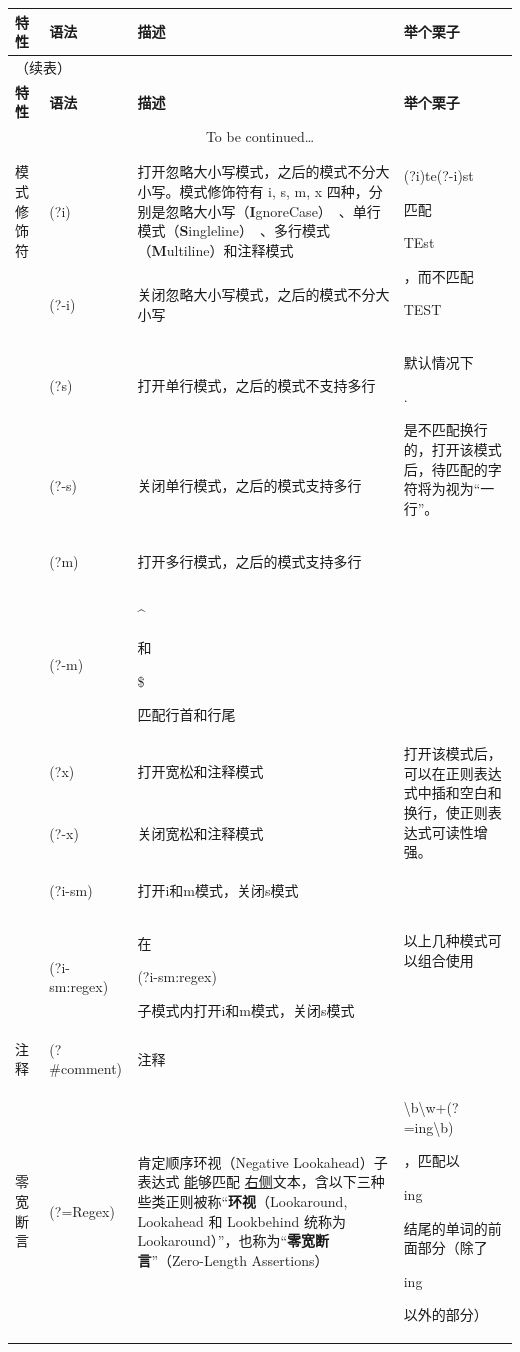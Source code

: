 \documentclass[12pt,a4paper,twoside]{ctexart}
\newcommand{\cbregex}[1]{\colorbox{orange!18}{\strut #1}}
\newcommand{\cbmatch}[1]{\colorbox{cyan!35}{\strut #1}}
\newcommand{\cbstring}[1]{\colorbox{green!20}{\strut #1}}
\begin{document}
\begin{center}

\begin{longtable}{p{4em}p{9em}p{25em}p{18em}}
  \toprule
  \textbf{特性} & \textbf{语法} & \textbf{描述} & \textbf{举个栗子} \\
  \midrule
  \endfirsthead                 %
  \multicolumn{4}{l}{（续表）} \\
  \toprule
  \textbf{特性} & \textbf{语法} & \textbf{描述} & \textbf{举个栗子} \\
  \midrule
  \endhead                      %
  \multicolumn{4}{c}{To be continued\ldots} \\[2ex]
  \endfoot                      %
  \bottomrule
  \endlastfoot                  %
  模式\newline{}修饰符 & \cbregex{(?i)} & 打开忽略大小写模式，之后的模式不分大小写。模式修饰符有 i, s, m, x 四种，分别是忽略大小写（\textbf{I}gnoreCase）~、单行模式（\textbf{S}ingleline）~、多行模式（\textbf{M}ultiline）和注释模式 & \multirow{2}{18em}{\cbregex{(?i)te(?-i)st} 匹配 \cbmatch{TEst}，而不匹配 \cbstring{TEST}} \\
  & \cbregex{(?-i)} & 关闭忽略大小写模式，之后的模式不分大小写 & \\
  & \cbregex{(?s)} & 打开单行模式，之后的模式不支持多行 & \multirow{2}{18em}{默认情况下\cbregex{.}是不匹配换行的，打开该模式后，待匹配的字符将为视为“一行”。} \\
  & \cbregex{(?-s)} & 关闭单行模式，之后的模式支持多行 & \\
  & \cbregex{(?m)} & 打开多行模式，之后的模式支持多行 & \\
  & \cbregex{(?-m)} & \cbregex{\^{}} 和 \cbregex{\$} 匹配行首和行尾 & \\
  & \cbregex{(?x)} & 打开宽松和注释模式 & \multirow{2}{18em}{打开该模式后，可以在正则表达式中插和空白和换行，使正则表达式可读性增强。} \\
  & \cbregex{(?-x)} & 关闭宽松和注释模式 & \\
  & \cbregex{(?i-sm)} & 打开i和m模式，关闭s模式 & \multirow{2}{18em}{以上几种模式可以组合使用} \\
  & \cbregex{(?i-sm:regex)} & 在\cbregex{(?i-sm:regex)} 子模式内打开i和m模式，关闭s模式 & \\
  \midrule
  注释 & (?\#comment) & 注释 & \\
  \midrule
  零宽断言 & (?=Regex) & 肯定顺序环视（Negative Lookahead）\newline{}子表达式 \underline{能}够匹配 \underline{右侧}文本，含以下三种些类正则被称“\textbf{环视}（Lookaround, Lookahead 和 Lookbehind 统称为 Lookaround）”，也称为“\textbf{零宽断言}”（Zero-Length Assertions） & \cbregex{\textbackslash{}b\textbackslash{}w+(?=ing\textbackslash{}b)}，匹配以\cbstring{ing}结尾的单词的前面部分（除了\cbstring{ing}以外的部分） \\

\end{longtable}
\end{center}
\end{document}
